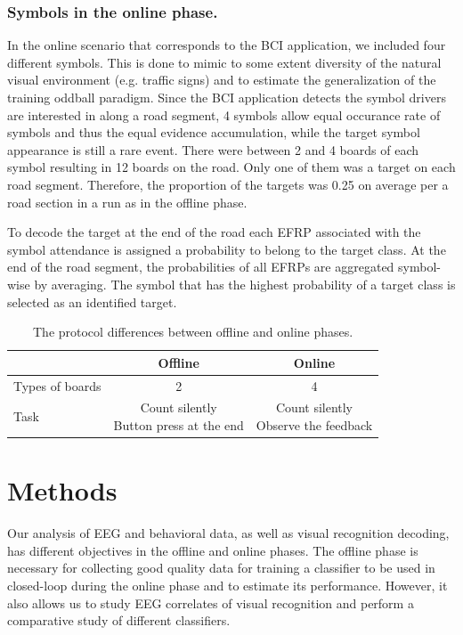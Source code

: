 \documentclass[12pt]{iopart}
\begin{document}
\subsubsection*{Symbols in the online phase.}
In the online scenario that corresponds to the BCI application, we included four different symbols. This is done to mimic to some extent diversity of the natural visual environment (e.g. traffic signs) and to estimate the generalization of the training oddball paradigm. Since the BCI application detects the symbol drivers are interested in along a road segment, 4 symbols allow equal occurance rate of symbols and thus the equal evidence accumulation, while the target symbol appearance is still a rare event. 
There were between 2 and 4 boards of each symbol resulting in 12 boards on the road.
Only one of them was a target on each road segment. Therefore, the proportion
of the targets was 0.25 on average per a road section in a run as in the offline phase.


To decode the target at the end of the road each EFRP associated with the
symbol attendance
is assigned a probability to belong to the target class.
At the end of the road segment, the probabilities
of all EFRPs are aggregated symbol-wise by averaging.
The symbol that has the highest probability of a target class
is selected as an identified target.

\begin{table}
    \centering
    \caption{The protocol differences between offline and online phases.}
    \begin{tabular}{l | c | c}
        \hline 
        & Offline & Online \\
        \hline 
        Types of boards & 2 & 4 \\
        \hline
        Task & \shortstack{Count silently \\ Button press at the end} & \shortstack{Count silently \\ Observe the feedback} \\
        \hline 
    \end{tabular}
    \label{tab:OffOn}
\end{table}



\section{Methods}
\label{sec:methods}
Our analysis of EEG and behavioral data, as well as visual
recognition decoding, has different objectives in the offline and online phases.
The offline phase is necessary for collecting good quality data
for training a classifier to be used in closed-loop during the online phase
and to estimate its performance. However, it also allows us 
to study EEG correlates of visual recognition and  perform a
comparative study of different classifiers.
\end{document}
